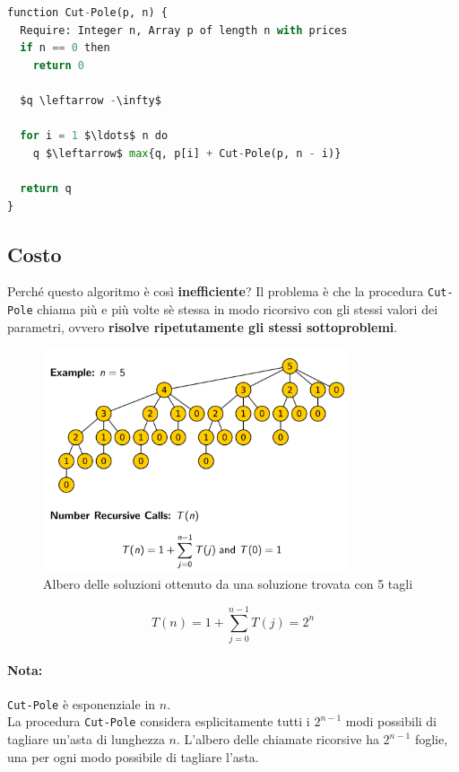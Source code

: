 \begin{lstlisting}[language=Python, mathescape=true]
function Cut-Pole(p, n) {
  Require: Integer n, Array p of length n with prices
  if n == 0 then
    return 0

  $q \leftarrow -\infty$

  for i = 1 $\ldots$ n do
    q $\leftarrow$ max{q, p[i] + Cut-Pole(p, n - i)}

  return q
}
\end{lstlisting}

\subsection{Costo}

Perché questo algoritmo è così \textbf{inefficiente}? Il problema è che
la procedura \texttt{Cut-Pole} chiama più e più volte sè stessa in modo
ricorsivo con gli stessi valori dei parametri, ovvero \textbf{risolve
  ripetutamente gli stessi sottoproblemi}.
\begin{figure}[H]
  \centering
  \includegraphics[width=9cm, keepaspectratio]{capitoli/programmazione_dinamica/imgs/pole4.png}
  \caption{Albero delle soluzioni ottenuto da una soluzione trovata con 5 tagli}
\end{figure}

$$
  T(n) = 1 + \sum^{n-1}_{j=0}T(j) = 2^n
$$

\paragraph*{Nota:} \texttt{Cut-Pole} è esponenziale in $n$.\\

La procedura \texttt{Cut-Pole} considera esplicitamente tutti i $2^{n-1}$ modi
possibili di tagliare un'asta di lunghezza $n$. L'albero delle
chiamate ricorsive ha $2^{n-1}$ foglie, una per ogni modo possibile di
tagliare l'asta.

